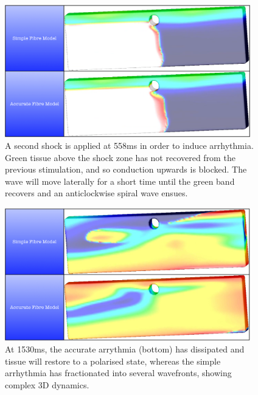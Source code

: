     \begin{figure}[htbp]
  		\centering
  	    \includegraphics[width=0.95\textwidth]{Ch4/Figs/shock_induced_558ms}
              \caption{A second shock is applied at 558ms in order to induce arrhythmia. Green tissue above the shock zone has not recovered from the previous stimulation, and so conduction upwards is blocked. The wave will move laterally for a short time until the green band recovers and an anticlockwise spiral wave ensues.}
  	  \label{fig:shock_induced_558ms}
  	\end{figure}
  	
    \begin{figure}[htbp]
  		\centering
  	    \includegraphics[width=0.95\textwidth]{Ch4/Figs/shock_induced_1530ms}
            \caption{At 1530ms, the accurate arrythmia (bottom) has dissipated and tissue will restore to a polarised state, whereas the simple arrhythmia has fractionated into several wavefronts, showing complex 3D dynamics.}
  	  \label{fig:shock_induced_1530ms}
  	\end{figure}
  	
